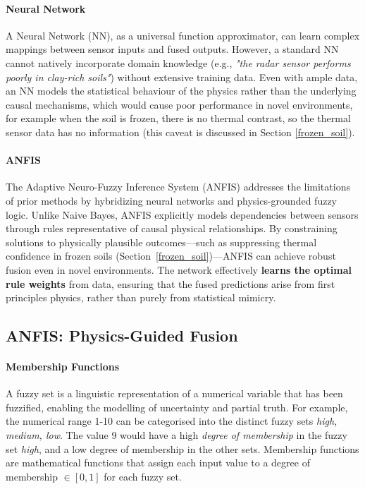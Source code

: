     \paragraph{Neural Network}

        A Neural Network (NN), as a universal function approximator, can learn complex mappings between sensor inputs and fused outputs. However, a standard NN cannot natively incorporate domain knowledge (e.g., \textit{"the radar sensor performs poorly in clay-rich soils"}) without extensive training data. Even with ample data, an NN models the statistical behaviour of the physics rather than the underlying causal mechanisms, which would cause poor performance in novel environments, for example when the soil is frozen, there is no thermal contrast, so the thermal sensor data  has no information (this caveat is discussed in Section \ref{frozen_soil}).


    \paragraph{ANFIS}

        The Adaptive Neuro-Fuzzy Inference System (ANFIS) \cite{jang1993anfis} addresses the limitations of prior methods by hybridizing neural networks and physics-grounded fuzzy logic. Unlike Naive Bayes, ANFIS explicitly models dependencies between sensors through rules representative of causal physical relationships. By constraining solutions to physically plausible outcomes—such as suppressing thermal confidence in frozen soils (Section~\ref{frozen_soil})—ANFIS can achieve robust fusion even in novel environments. The network effectively \textbf{learns the optimal rule weights} from data, ensuring that the fused predictions arise from first principles physics, rather than purely from statistical mimicry.


    
\subsection{ANFIS: Physics-Guided Fusion}

    \paragraph{Membership Functions}

        A fuzzy set is a linguistic representation of a numerical variable that has been fuzzified, enabling the modelling of uncertainty and partial truth. For example, the numerical range 1-10 can be categorised into the distinct fuzzy sets \textit{high, medium, low}. The value 9 would have a high \textit{degree of membership} in the fuzzy set \textit{high}, and a low degree of membership in the other sets. Membership functions are mathematical functions that assign each input value to a degree of membership \(\in [0,1]\) for each fuzzy set. 
        
